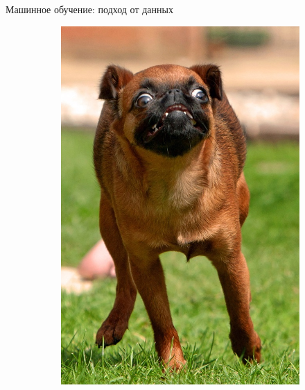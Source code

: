 \documentclass[aspectratio=169]{beamer}
\begin{document}
\begin{frame}{Машинное обучение: подход от данных}
\begin{figure}
\begin{subfigure}[b]{.1\linewidth}
            \includegraphics[width=\linewidth]{graphs/fig14_7.jpg}
        \end{subfigure}
        \begin{subfigure}[b]{.1\linewidth}

\end{subfigure}
\end{figure}
\end{frame}
\end{document}
